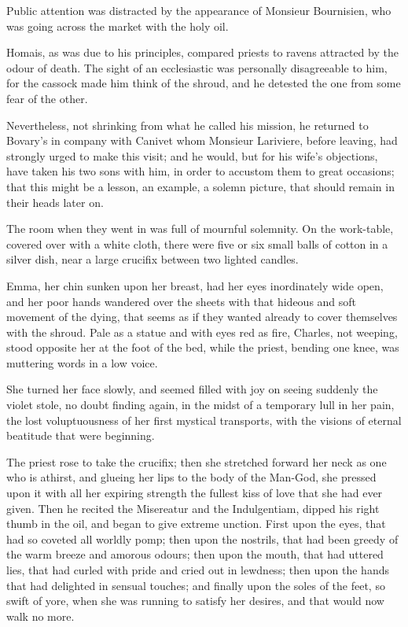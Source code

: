 \documentclass{tufte-book}
\begin{document}
Public attention was distracted by the appearance of Monsieur
Bournisien, who was going across the market with the holy oil.

Homais, as was due to his principles, compared priests to ravens
attracted by the odour of death. The sight of an ecclesiastic was
personally disagreeable to him, for the cassock made him think of the
shroud, and he detested the one from some fear of the other.

Nevertheless, not shrinking from what he called his mission, he returned
to Bovary's in company with Canivet whom Monsieur Lariviere, before
leaving, had strongly urged to make this visit; and he would, but for
his wife's objections, have taken his two sons with him, in order
to accustom them to great occasions; that this might be a lesson, an
example, a solemn picture, that should remain in their heads later on.

The room when they went in was full of mournful solemnity. On the
work-table, covered over with a white cloth, there were five or six
small balls of cotton in a silver dish, near a large crucifix between
two lighted candles.

Emma, her chin sunken upon her breast, had her eyes inordinately wide
open, and her poor hands wandered over the sheets with that hideous
and soft movement of the dying, that seems as if they wanted already to
cover themselves with the shroud. Pale as a statue and with eyes red as
fire, Charles, not weeping, stood opposite her at the foot of the bed,
while the priest, bending one knee, was muttering words in a low voice.

She turned her face slowly, and seemed filled with joy on seeing
suddenly the violet stole, no doubt finding again, in the midst of
a temporary lull in her pain, the lost voluptuousness of her first
mystical transports, with the visions of eternal beatitude that were
beginning.

The priest rose to take the crucifix; then she stretched forward her
neck as one who is athirst, and glueing her lips to the body of the
Man-God, she pressed upon it with all her expiring strength the fullest
kiss of love that she had ever given. Then he recited the Misereatur and
the Indulgentiam, dipped his right thumb in the oil, and began to give
extreme unction. First upon the eyes, that had so coveted all worldly
pomp; then upon the nostrils, that had been greedy of the warm breeze
and amorous odours; then upon the mouth, that had uttered lies, that had
curled with pride and cried out in lewdness; then upon the hands that
had delighted in sensual touches; and finally upon the soles of the
feet, so swift of yore, when she was running to satisfy her desires, and
that would now walk no more.
\end{document}
